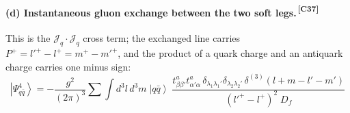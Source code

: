 \documentclass[11pt]{article}
\newcommand{\ibar}[2]{\draw[line width=1.1pt] (#1-0.13,#2) -- (#1+0.13,#2);}
\newcommand{\dthree}{\delta^{(3)}}
\newcommand{\ket}[1]{\left|#1\right\rangle}
\newcommand{\Jc}{\mathcal{J}}
\newcommand{\qk}[3]{q^{#1}_{#2}(#3)}
\newcommand{\aqk}[3]{\bar q^{#1}_{#2}(#3)}
\newcommand{\chg}[1]{{\color{blue!70!black}\textsuperscript{\,[C#1]}}}
\begin{document}
\paragraph{(d) Instantaneous gluon exchange between the two soft legs.\chg{37}}
\begin{center}
\end{center}
This is the $\Jc_{q}\!\cdot\!\Jc_{q}$ cross term; the exchanged line carries
$P^{+}=l'^{+}-l^{+}=m^{+}-m'^{+}$, and the product of a quark charge and an antiquark charge
carries one minus sign:
\begin{equation}
\ket{\Psi^{4}_{q\bar q}}=-\frac{g^{2}}{(2\pi)^{3}}\sum\int\!d^{3}l\,d^{3}m\;
\ket{q\bar q}\;
\frac{t^{a}_{\beta\beta'}t^{a}_{\alpha'\alpha}\,
\delta_{\lambda_{1}\lambda_{1}'}\delta_{\lambda_{2}\lambda_{2}'}\,\dthree(l+m-l'-m')}
{(l'^{+}-l^{+})^{2}\;D_{f}}
\label{eq:E1d}
\end{equation}
\end{document}
